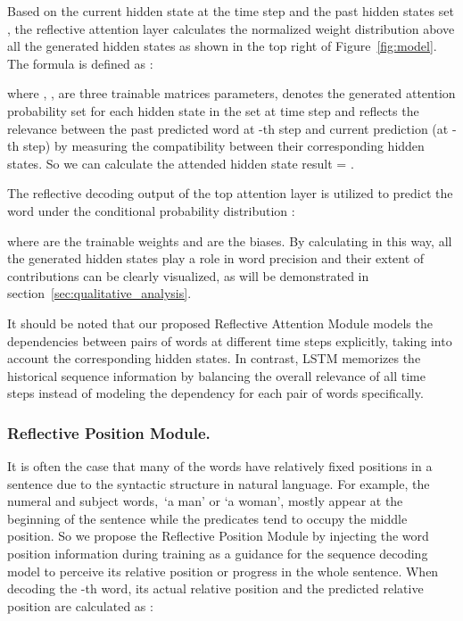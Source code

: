 \documentclass[10pt,twocolumn,letterpaper]{article}
\begin{document}
Based on the current hidden state  at the time step  and the past hidden states set , the reflective attention layer  calculates the normalized weight distribution  above all the generated  hidden states as shown in the top right of Figure~\ref{fig:model}. 
The formula is defined as : 


where   ,   ,    are three trainable matrices parameters,  denotes the generated attention probability set for each hidden state  in the set   at time step  and  reflects the relevance between the past predicted word at -th step and current prediction (at -th step) by measuring the compatibility between their corresponding hidden states.
So we can calculate the attended hidden state result  = .

The reflective decoding output  of the top attention layer  is utilized to predict the word  under the conditional probability distribution :

where    are the trainable weights and    are the biases.
By calculating  in this way, all the generated hidden states  play a role in word precision and their extent of contributions can be clearly visualized, as will be demonstrated in section~\ref{sec:qualitative_analysis}.

It should be noted that our proposed Reflective Attention Module models the dependencies between pairs of words at different time steps explicitly, taking into account the corresponding hidden states.
In contrast, LSTM memorizes the historical sequence information by balancing the overall relevance of all time steps instead of modeling the dependency for each pair of words specifically. 

\vspace{-0.15in}
\subsubsection{ Reflective Position Module.}
\vspace{-0.08in}
It is often the case that many of the words have relatively fixed positions in a sentence due to the syntactic structure in natural language.
For example, the numeral and subject words,~\ie `a man' or `a woman', mostly appear at the beginning of the sentence while the predicates tend to occupy the middle position.
So we propose the Reflective Position Module by injecting the word position information during training as a guidance for the sequence decoding model to perceive its relative position or progress in the whole sentence.
When decoding the -th word, its actual relative position  and the predicted relative position  are calculated as :
\vspace{-0.02in}
\end{document}
